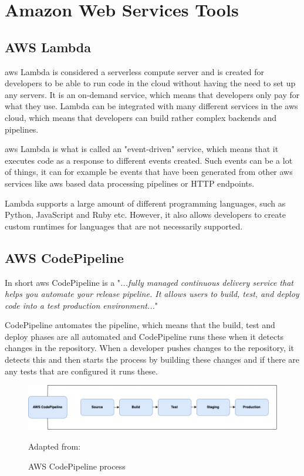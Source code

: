 \section{Amazon Web Services Tools}
\subsection{AWS Lambda}
\acrshort{aws} Lambda is considered a serverless compute server and is created for developers to be able to run code in the cloud without having the need to set up any servers. It is an on-demand service, which means that developers only pay for what they use. Lambda can be integrated with many different services in the \acrshort{aws} cloud, which means that developers can build rather complex backends and pipelines. 

\acrshort{aws} Lambda is what is called an "event-driven" service, which means that it executes code as a response to different events created. Such events can be a lot of things, it can for example be events that have been generated from other \acrshort{aws} services like \acrshort{aws} based data processing pipelines or HTTP endpoints. 

Lambda supports a large amount of different programming languages, such as Python, JavaScript and Ruby etc. However, it also allows developers to create custom runtimes for languages that are not necessarily supported. \cite{AWSLamda}



\subsection{AWS CodePipeline}
In short \acrshort{aws} CodePipeline is a "\textit{...fully managed continuous delivery service that helps you automate your release pipeline. It allows users to build, test, and deploy code into a test production environment...}"
\cite{AWSCodePipeline}

CodePipeline automates the pipeline, which means that the build, test and deploy phases are all automated and CodePipeline runs these when it detects changes in the repository. When a developer pushes changes to the repository, it detects this and then starts the process by building these changes and if there are any tests that are configured it runs these. \cite{AWSCodePipeline1}
\begin{figure}[htp]
    \centering
    \includegraphics[width=1\columnwidth]{Images/CodePipeline.png}
    \caption{AWS CodePipeline process}Adapted from: \cite{AWSCodePipeline2}
    \label{fig:my_label}
\end{figure}

